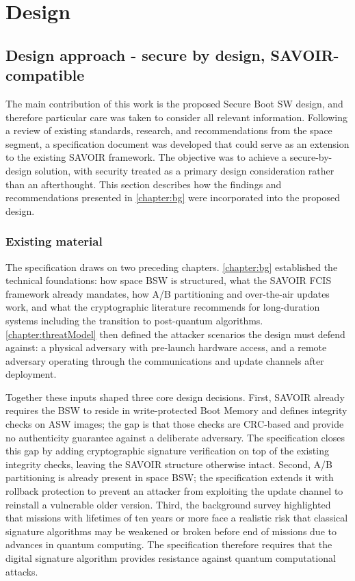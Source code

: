 \chapter{Design}
\label{chapter:design}

\section{Design approach - secure by design, SAVOIR-compatible}
\label{section:design-approach}

The main contribution of this work is the proposed Secure Boot SW design, and therefore particular care was taken to consider all relevant information. Following a review of existing standards, research, and recommendations from the space segment, a specification document was developed that could serve as an extension to the existing SAVOIR framework. The objective was to achieve a secure-by-design solution, with security treated as a primary design consideration rather than an afterthought. This section describes how the findings and recommendations presented in \autoref{chapter:bg} were incorporated into the proposed design. 

\subsection{Existing material}
\label{subsection:design-approach-existing}

The specification draws on two preceding chapters. \autoref{chapter:bg} established the technical foundations: how space BSW is structured, what the SAVOIR FCIS framework already mandates, how A/B partitioning and over-the-air updates work, and what the cryptographic literature recommends for long-duration systems including the transition to post-quantum algorithms. \autoref{chapter:threatModel} then defined the attacker scenarios the design must defend against: a physical adversary with pre-launch hardware access, and a remote adversary operating through the communications and update channels after deployment.

Together these inputs shaped three core design decisions. First, SAVOIR already requires the BSW to reside in write-protected Boot Memory and defines integrity checks on ASW images; the gap is that those checks are CRC-based and provide no authenticity guarantee against a deliberate adversary. The specification closes this gap by adding cryptographic signature verification on top of the existing integrity checks, leaving the SAVOIR structure otherwise intact. Second, A/B partitioning is already present in space BSW; the specification extends it with rollback protection to prevent an attacker from exploiting the update channel to reinstall a vulnerable older version. Third, the background survey highlighted that missions with lifetimes of ten years or more face a realistic risk that classical signature algorithms may be weakened or broken before end of missions due to advances in quantum computing. The specification therefore requires that the digital signature algorithm provides resistance against quantum computational attacks.


